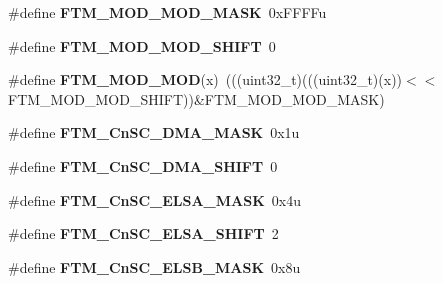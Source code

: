 \begin{DoxyCompactItemize}
\item 
\#define {\bfseries F\+T\+M\+\_\+\+M\+O\+D\+\_\+\+M\+O\+D\+\_\+\+M\+A\+SK}~0x\+F\+F\+F\+Fu\hypertarget{group__FTM__Register__Masks_gae815072c26d186e4ad07654080c7cb97}{}\label{group__FTM__Register__Masks_gae815072c26d186e4ad07654080c7cb97}

\item 
\#define {\bfseries F\+T\+M\+\_\+\+M\+O\+D\+\_\+\+M\+O\+D\+\_\+\+S\+H\+I\+FT}~0\hypertarget{group__FTM__Register__Masks_gac10320219038f5acd0cc6ed04c4f1f48}{}\label{group__FTM__Register__Masks_gac10320219038f5acd0cc6ed04c4f1f48}

\item 
\#define {\bfseries F\+T\+M\+\_\+\+M\+O\+D\+\_\+\+M\+OD}(x)~(((uint32\+\_\+t)(((uint32\+\_\+t)(x))$<$$<$F\+T\+M\+\_\+\+M\+O\+D\+\_\+\+M\+O\+D\+\_\+\+S\+H\+I\+FT))\&F\+T\+M\+\_\+\+M\+O\+D\+\_\+\+M\+O\+D\+\_\+\+M\+A\+SK)\hypertarget{group__FTM__Register__Masks_ga80e3c2799c6f4480a6b8c983783ee052}{}\label{group__FTM__Register__Masks_ga80e3c2799c6f4480a6b8c983783ee052}

\item 
\#define {\bfseries F\+T\+M\+\_\+\+Cn\+S\+C\+\_\+\+D\+M\+A\+\_\+\+M\+A\+SK}~0x1u\hypertarget{group__FTM__Register__Masks_gab38e53cd8f53bb325b849510374280f8}{}\label{group__FTM__Register__Masks_gab38e53cd8f53bb325b849510374280f8}

\item 
\#define {\bfseries F\+T\+M\+\_\+\+Cn\+S\+C\+\_\+\+D\+M\+A\+\_\+\+S\+H\+I\+FT}~0\hypertarget{group__FTM__Register__Masks_ga86e1227e22b8a08811a810d4f8415ef1}{}\label{group__FTM__Register__Masks_ga86e1227e22b8a08811a810d4f8415ef1}

\item 
\#define {\bfseries F\+T\+M\+\_\+\+Cn\+S\+C\+\_\+\+E\+L\+S\+A\+\_\+\+M\+A\+SK}~0x4u\hypertarget{group__FTM__Register__Masks_gab5c67eddb15cb1814ba34d7d65bcee29}{}\label{group__FTM__Register__Masks_gab5c67eddb15cb1814ba34d7d65bcee29}

\item 
\#define {\bfseries F\+T\+M\+\_\+\+Cn\+S\+C\+\_\+\+E\+L\+S\+A\+\_\+\+S\+H\+I\+FT}~2\hypertarget{group__FTM__Register__Masks_gae5475c81aa249750da2a97ee1d1d525a}{}\label{group__FTM__Register__Masks_gae5475c81aa249750da2a97ee1d1d525a}

\item 
\#define {\bfseries F\+T\+M\+\_\+\+Cn\+S\+C\+\_\+\+E\+L\+S\+B\+\_\+\+M\+A\+SK}~0x8u\hypertarget{group__FTM__Register__Masks_ga7f4800478dfa63921e229a7ea4a7c067}{}\label{group__FTM__Register__Masks_ga7f4800478dfa63921e229a7ea4a7c067}


\end{DoxyCompactItemize}
